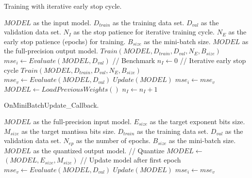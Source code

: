 \begin{algorithm}[h!]
	\label{alg:training}
	\caption{Training with iterative early stop cycle.}
	\begin{algorithmic}
		\SetAlgoLined
		\renewcommand{\algorithmicrequire}{\textbf{input:}}
		\renewcommand{\algorithmicensure}{\textbf{output:}}
		\REQUIRE $MODEL$ as the input model.
		\REQUIRE $D_{train}$ as the training data set.
		\REQUIRE $D_{val}$ as the validation data set.
		\REQUIRE $N_{I}$ as the stop patience for iterative training cycle.
		\REQUIRE $N_{E}$ as the early stop patience (epochs) for training.
		\REQUIRE $B_{size}$ as the mini-batch size.
		\ENSURE $MODEL$ as the full-precision output model.
		\STATE $Train(MODEL, D_{train}, D_{val}, N_{E}, B_{size})$
		\STATE $mse_i \gets Evaluate(MODEL, D_{val})$ // Benchmark
		\STATE $n_I \gets 0$
		\STATE // Iterative early stop cycle
		\STATE $Train(MODEL, D_{train}, D_{val}, N_{E}, B_{size})$
		\STATE $mse_v \gets Evaluate(MODEL, D_{val})$
			\STATE $Update(MODEL)$
			\STATE $mse_i \gets mse_v$
		\ELSE
			\STATE $MODEL  \gets LoadPreviousWeights()$
			\STATE $n_I \gets n_I + 1$
		\ENDIF
		\ENDWHILE
	\end{algorithmic}
\end{algorithm}


\begin{algorithm}[h!]
	\label{alg:quantization_integration}
	\caption{OnMiniBatchUpdate\_Callback.}
	\begin{algorithmic}
		\SetAlgoLined
		\renewcommand{\algorithmicrequire}{\textbf{input:}}
		\renewcommand{\algorithmicensure}{\textbf{output:}}
		\REQUIRE $MODEL$ as the full-precision input model.
		\REQUIRE $E_{size}$ as the target exponent bits size.
		\REQUIRE $M_{size}$ as the target mantissa bits size.
		\REQUIRE $D_{train}$ as the training data set.
		\REQUIRE $D_{val}$ as the validation data set.
		\REQUIRE $N_{ep}$ as the number of epochs.
		\REQUIRE $B_{size}$ as the mini-batch size.
		\ENSURE $MODEL$ as the quantized output model.
		\STATE // Quantize
		\STATE $MODEL \gets$ $(MODEL,E_{size}, M_{size})$ 
		\IF {$1<epoch$}
		\STATE // Update model after first epoch
		\STATE $mse_v \gets Evaluate(MODEL, D_{val})$
		\IF{$mse_v < mse_i$}
		\STATE $Update(MODEL)$
		\STATE $mse_i \gets mse_v$
		\ENDIF
		\ENDIF
	\end{algorithmic}
\end{algorithm}

